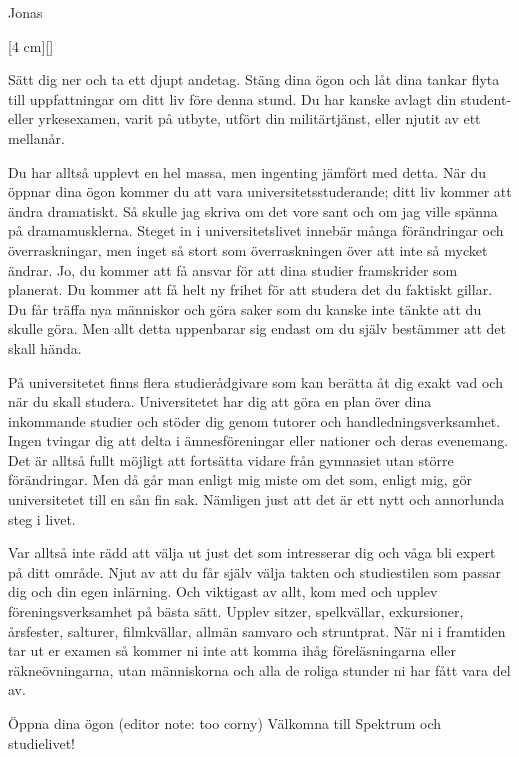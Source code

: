 \documentclass{spektraklet}
\begin{document}
\begin{ordforandespalten}{Jonas}

[4 cm][]

Sätt dig ner och ta ett djupt andetag. Stäng dina ögon och låt dina tankar flyta till uppfattningar om ditt liv före denna stund. Du har kanske avlagt din student- eller yrkesexamen, varit på utbyte, utfört din militärtjänst, eller njutit av ett mellanår.
 
Du har alltså upplevt en hel massa, men ingenting jämfört med detta. När du öppnar dina ögon kommer du att vara universitetsstuderande; ditt liv kommer att ändra dramatiskt. Så skulle jag skriva om det vore sant och om jag ville spänna på dramamusklerna. Steget in i universitetslivet innebär många förändringar och överraskningar, men inget så stort som överraskningen över att inte så mycket ändrar. Jo, du kommer att få ansvar för att dina studier framskrider som planerat. Du kommer att få helt ny frihet för att studera det du faktiskt gillar. Du får träffa nya människor och göra saker som du kanske inte tänkte att du skulle göra. Men allt detta uppenbarar sig endast om du själv bestämmer att det skall hända.
 
På universitetet finns flera studierådgivare som kan berätta åt dig exakt vad och när du skall studera. Universitetet har dig att göra en plan över dina inkommande studier och stöder dig genom tutorer och handledningsverksamhet. Ingen tvingar dig att delta i ämnesföreningar eller nationer och deras evenemang. Det är alltså fullt möjligt att fortsätta vidare från gymnasiet utan större förändringar. Men då går man enligt mig miste om det som, enligt mig, gör universitetet till en sån fin sak. Nämligen just att det är ett nytt och annorlunda steg i livet.
 
Var alltså inte rädd att välja ut just det som intresserar dig och våga bli expert på ditt område. Njut av att du får själv välja takten och studiestilen som passar dig och din egen inlärning. Och viktigast av allt, kom med och upplev föreningsverksamhet på bästa sätt. Upplev sitzer, spelkvällar, exkursioner, årsfester, salturer, filmkvällar, allmän samvaro och struntprat. När ni i framtiden tar ut er examen så kommer ni inte att komma ihåg föreläsningarna eller räkneövningarna, utan människorna och alla de roliga stunder ni har fått vara del av.
 
Öppna dina ögon (editor note: too corny) Välkomna till Spektrum och studielivet!

\end{ordforandespalten}
\end{document}
